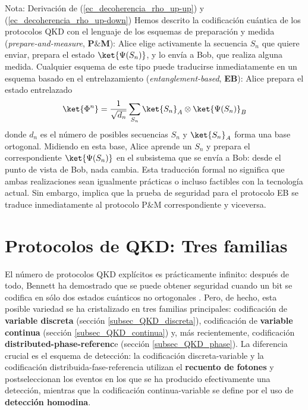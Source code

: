 \documentclass[a4paper,11pt]{book} %
\numberwithin{equation}{chapter}
\begin{document}
\begin{mybox_blue}{Nota: Derivación de (\ref{ec_decoherencia_rho_up-up}) y  (\ref{ec_decoherencia_rho_up-down})}
Hemos descrito la codificación cuántica de los protocolos QKD con el lenguaje de los esquemas de preparación y medida (\textit{prepare-and-measure}, \textbf{P$\&$M}): Alice elige activamente la secuencia $S_n$ que quiere enviar, prepara el estado $\ket{\Psi(S_n)}$, y lo envía a Bob, que realiza alguna medida. Cualquier esquema de este tipo puede traducirse inmediatamente en un esquema basado en el entrelazamiento (\textit{entanglement-based}, \textbf{EB}): Alice prepara el estado entrelazado
	\begin{equation}
	\ket{\Phi^n} = \frac{1}{\sqrt{d_n}} \sum_{S_n} \ket{S_n}_A \otimes \ket{\Psi(S_n)}_B
	\end{equation}
donde $d_n$ es el número de posibles secuencias $S_n$ y $\ket{S_n}_A$ forma una base ortogonal. Midiendo en esta base, Alice aprende un $S_n$ y prepara el correspondiente $\ket{\Psi(S_n)}$ en el subsistema que se envía a Bob: desde el punto de vista de Bob, nada cambia. Esta traducción formal no significa que ambas realizaciones sean igualmente prácticas o incluso factibles con la tecnología actual. Sin embargo, implica que la prueba de seguridad para el protocolo EB se traduce inmediatamente al protocolo P$\&$M correspondiente y viceversa.
		
	\section{Protocolos de QKD: Tres familias}
	
El número de protocolos QKD explícitos es prácticamente infinito: después de todo, Bennett ha demostrado que se puede obtener seguridad cuando un bit se codifica en sólo dos estados cuánticos no ortogonales \cite{BB84_E91_iguales}. Pero, de hecho, esta posible variedad se ha cristalizado en tres familias principales: codificación de \textbf{variable discreta} (sección \ref{subsec_QKD_discreta}), codificación de \textbf{variable continua} (sección \ref{subsec_QKD_continua}) y, más recientemente, codificación \textbf{distributed-phase-referenc}e (sección \ref{subsec_QKD_phase}). La diferencia crucial es el esquema de detección: la codificación discreta-variable y la codificación distribuida-fase-referencia utilizan el \textbf{recuento de fotones} y postseleccionan los eventos en los que se ha producido efectivamente una detección, mientras que la codificación continua-variable se define por el uso de \textbf{detección homodina}.


\end{mybox_blue}
\end{document}
